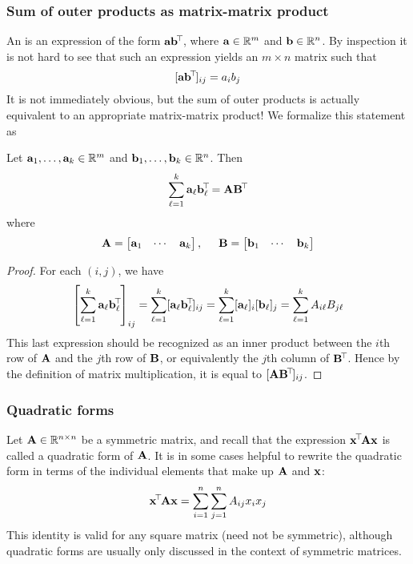 \subsubsection{Sum of outer products as matrix-matrix product}
An  is an expression of the form $\mathbf{a}\mathbf{b}^{\!\top\!}$, where $\mathbf{a} \in \mathbb{R}^m$ and $\mathbf{b} \in \mathbb{R}^n$.
By inspection it is not hard to see that such an expression yields an $m \times n$ matrix such that
\[[\mathbf{a}\mathbf{b}^{\!\top\!}]_{ij} = a_ib_j\]
It is not immediately obvious, but the sum of outer products is actually equivalent to an appropriate matrix-matrix product!
We formalize this statement as
\begin{proposition}
Let $\mathbf{a}_1, \dots, \mathbf{a}_k \in \mathbb{R}^m$ and $\mathbf{b}_1, \dots, \mathbf{b}_k \in \mathbb{R}^n$. Then
\[\sum_{\ell=1}^k \mathbf{a}_\ell\mathbf{b}_\ell^{\!\top\!} = \mathbf{A}\mathbf{B}^{\!\top\!}\]
where
\[\mathbf{A} = \begin{bmatrix}\mathbf{a}_1 & \cdots & \mathbf{a}_k\end{bmatrix}, \hspace{0.5cm} \mathbf{B} = \begin{bmatrix}\mathbf{b}_1 & \cdots & \mathbf{b}_k\end{bmatrix}\]
\end{proposition}
\begin{proof}
For each $(i,j)$, we have
\[\left[\sum_{\ell=1}^k \mathbf{a}_\ell\mathbf{b}_\ell^{\!\top\!}\right]_{ij} = \sum_{\ell=1}^k [\mathbf{a}_\ell\mathbf{b}_\ell^{\!\top\!}]_{ij} = \sum_{\ell=1}^k [\mathbf{a}_\ell]_i[\mathbf{b}_\ell]_j = \sum_{\ell=1}^k A_{i\ell}B_{j\ell}\]
This last expression should be recognized as an inner product between the $i$th row of $\mathbf{A}$ and the $j$th row of $\mathbf{B}$, or equivalently the $j$th column of $\mathbf{B}^{\!\top\!}$.
Hence by the definition of matrix multiplication, it is equal to $[\mathbf{A}\mathbf{B}^{\!\top\!}]_{ij}$.
\end{proof}

\subsubsection{Quadratic forms}
Let $\mathbf{A} \in \mathbb{R}^{n \times n}$ be a symmetric matrix, and recall that the expression $\mathbf{x}^{\!\top\!}\mathbf{A}\mathbf{x}$ is called a quadratic form of $\mathbf{A}$.
It is in some cases helpful to rewrite the quadratic form in terms of the individual elements that make up $\mathbf{A}$ and $\mathbf{x}$:
\[\mathbf{x}^{\!\top\!}\mathbf{A}\mathbf{x} = \sum_{i=1}^n\sum_{j=1}^n A_{ij}x_ix_j\]
This identity is valid for any square matrix (need not be symmetric), although quadratic forms are usually only discussed in the context of symmetric matrices.